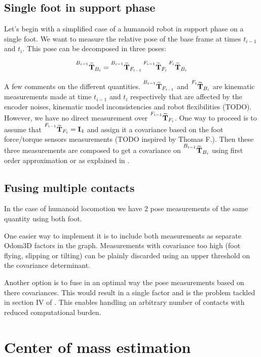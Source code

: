 \documentclass[11pt]{article}
\newcommand{\Tm}[2]{\prescript{#1}{}{\widetilde{\bfT}}_{#2}}
\begin{document}
\subsection{Single foot in support phase}
Let's begin with a simplified case of a humanoid robot in support phase on a single foot.
We want to measure the relative pose of the base frame at times $t_{i-1}$ and $t_i$. This pose can be decomposed in three poses: 

\begin{equation*}
\Tm{B_{i-1}}{B_i} = 
\Tm{B_{i-1}}{F_{i-1}}
\Tm{F_{i-1}}{F_{i}} 
\Tm{F_{i}}{B_i}     
\end{equation*}

A few comments on the different quantities. $ \Tm{B_{i-1}}{F_{i-1}} $ and $ \Tm{F_{i}}{B_i} $ are kinematic measurements made at time $t_{i-1}$ and $t_{i}$ respectively that are affected by the encoder noises, kinematic model inconsistencies and robot flexibilities (TODO). However, we have no direct measurement over $\Tm{F_{i-1}}{F_{i}}$. One way to proceed is to assume that $\Tm{F_{i-1}}{F_{i}}=\bfI_4$ and assign it a covariance based on the foot force/torque sensors measurements (TODO inspired by Thomas F.). Then these three measurements are composed to get a covariance on $\Tm{B_{i-1}}{B_i}$ using first order approximation or as explained in \cite{barfoot2014associating}.

\subsection{Fusing multiple contacts}
In the case of humanoid locomotion we have 2 pose measurements of the same quantity using both foot. 

One easier way to implement it is to include both measurements as separate Odom3D factors in the graph. Measurements with covariance too high (foot flying, slipping or tilting) can be plainly discarded using an upper threshold on the covariance determinant.

Another option is to fuse in an optimal way the pose measurements based on there covariances. This would result in a single factor and is the problem tackled in section IV of \cite{barfoot2014associating}. This enables handling an arbitrary number of contacts with reduced computational burden.


\section{Center of mass estimation}
\end{document}
